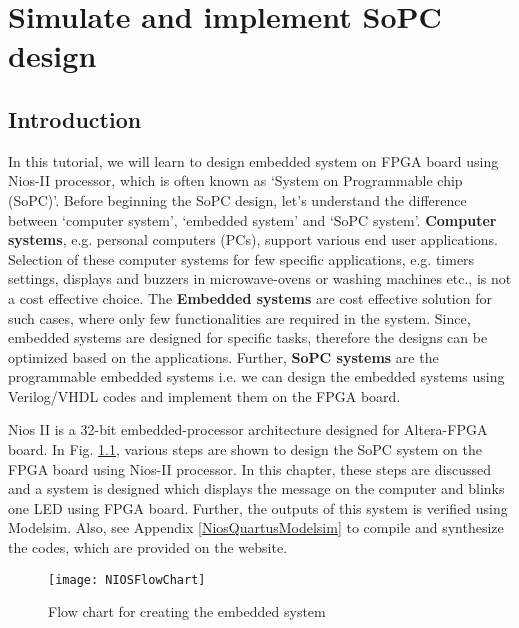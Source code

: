 \chapter{Simulate and implement SoPC design} \label{ch:NiosOverview}

\graphicspath{{Chapters/NiosOverview/Figures/}}


\section{Introduction}
In this tutorial, we will learn to design embedded system on FPGA board using Nios-II processor, which is often known as `System on Programmable chip (SoPC)'. Before beginning the SoPC design, let's understand the difference between `computer system', `embedded system' and `SoPC system'. \textbf{Computer systems}, e.g. personal computers (PCs), support various end user applications. Selection of these computer systems for few specific applications, e.g. timers settings, displays and buzzers in microwave-ovens or washing machines etc.,  is not a cost effective choice. The \textbf{Embedded systems} are cost effective solution for such cases, where only few functionalities are required in the system.  Since, embedded systems are designed for specific tasks, therefore the designs can be optimized based on the applications. Further, \textbf{SoPC systems} are the programmable embedded systems i.e. we can design the embedded systems using Verilog/VHDL codes and implement them on the FPGA board.

Nios II is a 32-bit embedded-processor architecture designed for Altera-FPGA board. In Fig. \ref{fig:NiosFlowChart}, various steps are shown to design the SoPC system on the FPGA board using Nios-II processor. In this chapter, these steps are discussed and a system is designed which displays the message on the computer and blinks one LED using FPGA board. Further, the outputs of this system is verified using Modelsim.  Also, see Appendix \ref{NiosQuartusModelsim} to compile and synthesize the codes, which are provided on the website.

\begin{figure}[!h]
	\centering
	\texttt{[image: NIOSFlowChart]}
	\caption{Flow chart for creating the embedded system}
	\label{fig:NiosFlowChart}
\end{figure}

